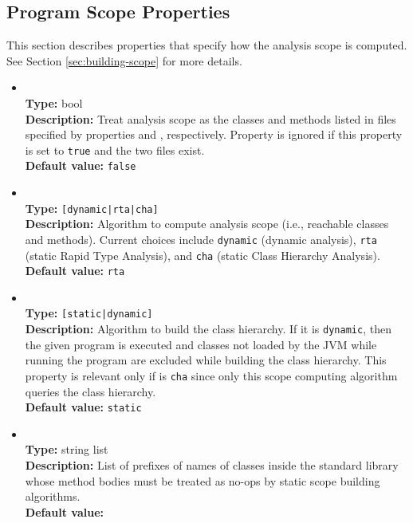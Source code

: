 \subsection{Program Scope Properties}
\label{sec:scope-props}

This section describes properties that specify how the analysis scope is computed.
See Section \ref{sec:building-scope} for more details.

\begin{itemize}
\item
{} \\
{\bf Type:} bool \\
{\bf Description:} Treat analysis scope as the classes and methods listed in files specified by properties  and , respectively.  Property  is ignored if this property is set to {\tt true} and the two files exist. \\
{\bf Default value:} {\tt false}

\item
{} \\
{\bf Type:} {\tt [dynamic|rta|cha]} \\
{\bf Description:} Algorithm to compute analysis scope (i.e., reachable classes and methods).  Current choices include {\tt dynamic} (dynamic analysis), {\tt rta} (static Rapid Type Analysis), and {\tt cha} (static Class Hierarchy Analysis). \\
{\bf Default value:} {\tt rta}

\item
{} \\
{\bf Type:} {\tt [static|dynamic]} \\
{\bf Description:} Algorithm to build the class hierarchy.  If it is {\tt dynamic}, then the given program is executed and classes not loaded by the JVM while running the program are excluded while building the class hierarchy.  This property is relevant only if  is {\tt cha} since only this scope computing algorithm queries the class hierarchy. \\
{\bf Default value:} {\tt static} 


\item
{} \\
{\bf Type:} string list \\
{\bf Description:} List of prefixes of names of classes inside the standard library whose method bodies must be treated as no-ops by static scope building algorithms. \\
{\bf Default value:} 


\end{itemize}

